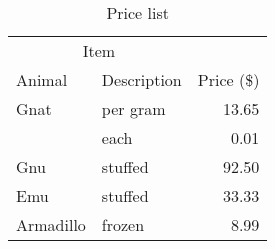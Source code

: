 \begin{table}[H]
    \centering

    \begin{tabular}{@{}llr@{}}  
        \toprule
        \multicolumn{2}{c}{Item} \\
        \cmidrule(r){1-2}
        Animal    & Description & Price (\$) \\
        \midrule
        Gnat      & per gram    & 13.65      \\
                  &    each     & 0.01       \\
        Gnu       & stuffed     & 92.50      \\
        Emu       & stuffed     & 33.33      \\
        Armadillo & frozen      & 8.99       \\
        \bottomrule
    \end{tabular}
    
    \caption{Price list}
    \label{tab:my_label}
\end{table}
